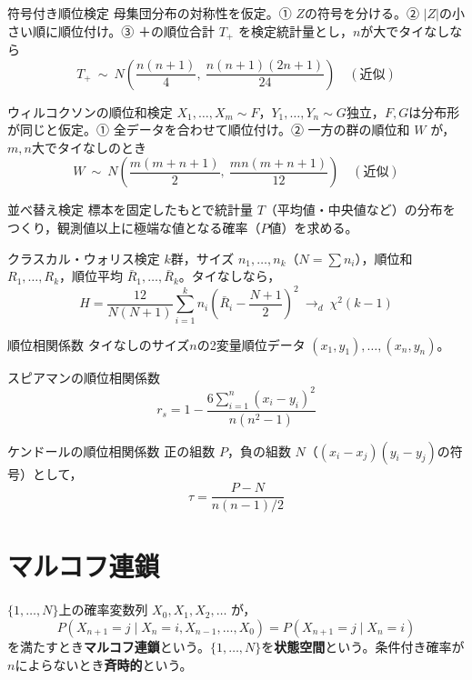 \documentclass[a4paper,11pt]{ltjsarticle}
\begin{document}
\begin{term}{符号付き順位検定}
母集団分布の対称性を仮定。① $Z$の符号を分ける。② $|Z|$の小さい順に順位付け。③ ＋の順位合計 $T_+$ を検定統計量とし，$n$が大でタイなしなら
\[
T_+ \ \sim\ N\!\left(\frac{n(n+1)}{4},\ \frac{n(n+1)(2n+1)}{24}\right)\quad(\text{近似})
\]
\end{term}

\begin{term}{ウィルコクソンの順位和検定}
$X_1,\dots,X_m\sim F$，$Y_1,\dots,Y_n\sim G$独立，$F,G$は分布形が同じと仮定。① 全データを合わせて順位付け。② 一方の群の順位和 $W$ が，$m,n$大でタイなしのとき
\[
W \ \sim\ N\!\left(\frac{m(m+n+1)}{2},\ \frac{mn(m+n+1)}{12}\right)\quad(\text{近似})
\]
\end{term}

\begin{term}{並べ替え検定}
標本を固定したもとで統計量 $T$（平均値・中央値など）の分布をつくり，観測値以上に極端な値となる確率（$P$値）を求める。
\end{term}

\begin{term}{クラスカル・ウォリス検定}
$k$群，サイズ $n_1,\dots,n_k$（$N=\sum n_i$），順位和 $R_1,\dots,R_k$，順位平均 $\bar R_1,\dots,\bar R_k$。タイなしなら，
\[
H = \frac{12}{N(N+1)}\sum_{i=1}^k n_i\left(\bar R_i-\frac{N+1}{2}\right)^2 \ \to_d\ \chi^2(k-1)
\]
\end{term}

\begin{term}{順位相関係数}
タイなしのサイズ$n$の2変量順位データ $(x_1,y_1),\dots,(x_n,y_n)$。
\end{term}

\begin{term}{スピアマンの順位相関係数}
\[
r_s = 1 - \frac{6\sum_{i=1}^n (x_i-y_i)^2}{n(n^2-1)}
\]
\end{term}

\begin{term}{ケンドールの順位相関係数}
正の組数 $P$，負の組数 $N$（$(x_i-x_j)(y_i-y_j)$の符号）として，
\[
\tau = \frac{P-N}{n(n-1)/2}
\]
\end{term}


\section{マルコフ連鎖}

$\{1,\dots,N\}$上の確率変数列 $X_0,X_1,X_2,\dots$ が，
\[
P(X_{n+1}=j\mid X_n=i,X_{n-1},\dots,X_0) = P(X_{n+1}=j\mid X_n=i)
\]
を満たすとき\textbf{マルコフ連鎖}という。$\{1,\dots,N\}$を\textbf{状態空間}という。条件付き確率が$n$によらないとき\textbf{斉時的}という。
\end{document}
